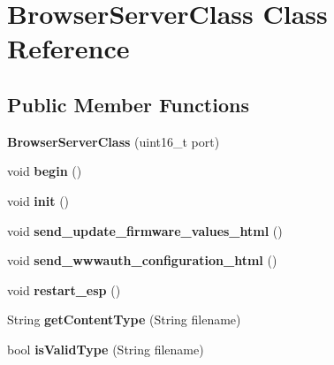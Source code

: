 \hypertarget{class_browser_server_class}{\section{Browser\-Server\-Class Class Reference}
\label{class_browser_server_class}
}
\subsection*{Public Member Functions}
\begin{DoxyCompactItemize}
\item 
\hypertarget{class_browser_server_class_a029352059c7aa0997ffcc65cf19dd5d5}{{\bfseries Browser\-Server\-Class} (uint16\-\_\-t port)}\label{class_browser_server_class_a029352059c7aa0997ffcc65cf19dd5d5}

\item 
\hypertarget{class_browser_server_class_a69aecd70a879f3096fea7ce6a976a190}{void {\bfseries begin} ()}\label{class_browser_server_class_a69aecd70a879f3096fea7ce6a976a190}

\item 
\hypertarget{class_browser_server_class_ac64a0067ec1d6911aa85170dd8cbaca0}{void {\bfseries init} ()}\label{class_browser_server_class_ac64a0067ec1d6911aa85170dd8cbaca0}

\item 
\hypertarget{class_browser_server_class_a3e015d81db7dc568ef5f810869d4832e}{void {\bfseries send\-\_\-update\-\_\-firmware\-\_\-values\-\_\-html} ()}\label{class_browser_server_class_a3e015d81db7dc568ef5f810869d4832e}

\item 
\hypertarget{class_browser_server_class_a768a782009a56e2e12307c77e891e9bc}{void {\bfseries send\-\_\-wwwauth\-\_\-configuration\-\_\-html} ()}\label{class_browser_server_class_a768a782009a56e2e12307c77e891e9bc}

\item 
\hypertarget{class_browser_server_class_a12ae1f5734efe0a6fbab37533b61c753}{void {\bfseries restart\-\_\-esp} ()}\label{class_browser_server_class_a12ae1f5734efe0a6fbab37533b61c753}

\item 
\hypertarget{class_browser_server_class_a9f9462e6e2855654c6049a3fff991621}{String {\bfseries get\-Content\-Type} (String filename)}\label{class_browser_server_class_a9f9462e6e2855654c6049a3fff991621}

\item 
\hypertarget{class_browser_server_class_afbd0d58ee98a900588bd3f672fb272ec}{bool {\bfseries is\-Valid\-Type} (String filename)}\label{class_browser_server_class_afbd0d58ee98a900588bd3f672fb272ec}


\end{DoxyCompactItemize}
